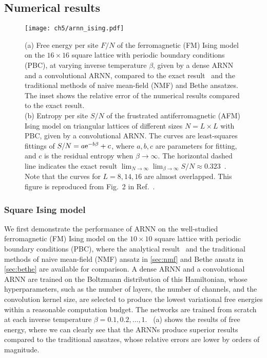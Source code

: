 \subsection{Numerical results}

\begin{figure}[htb]
\centering
\texttt{[image: ch5/arnn\_ising.pdf]}
\caption[ARNN results of Ising model on square and triangular lattices]{
(a) Free energy per site $F / N$ of the ferromagnetic (FM) Ising model on the $16 \times 16$ square lattice with periodic boundary conditions (PBC), at varying inverse temperature $\beta$, given by a dense ARNN and a convolutional ARNN, compared to the exact result~\cite{onsager1944crystal} and the traditional methods of naive mean-field (NMF) and Bethe ansatzes.
The inset shows the relative error of the numerical results compared to the exact result. \\
(b) Entropy per site $S / N$ of the frustrated antiferromagnetic (AFM) Ising model on triangular lattices of different sizes $N = L \times L$ with PBC, given by a convolutional ARNN.
The curves are least-squares fittings of $S / N = a \mathrm{e}^{-b \beta} + c$, where $a, b, c$ are parameters for fitting, and $c$ is the residual  entropy when $\beta \to \infty$.
The horizontal dashed line indicates the exact result $\lim_{N \to \infty} \lim_{\beta \to \infty} S / N \approx 0.323$~\cite{wannier1950antiferromagnetism, wannier1973antiferromagnetism, houtappel1950order}.
Note that the curves for $L = 8, 14, 16$ are almost overlapped.
This figure is reproduced from Fig.~2 in Ref.~\cite{wu2019solving}.
}
\label{fig:arnn-ising}
\end{figure}

\subsubsection{Square Ising model}

We first demonstrate the performance of ARNN on the well-studied ferromagnetic (FM) Ising model on the $10 \times 10$ square lattice with periodic boundary conditions (PBC), where the analytical result~\cite{onsager1944crystal} and the traditional methods of naive mean-field (NMF) ansatz in \cref{sec:nmf} and Bethe ansatz in \cref{sec:bethe} are available for comparison. A dense ARNN and a convolutional ARNN are trained on the Boltzmann distribution of this Hamiltonian, whose hyperparameters, such as the number of layers, the number of channels, and the convolution kernel size, are selected to produce the lowest variational free energies within a reasonable computation budget. The networks are trained from scratch at each inverse temperature $\beta = 0.1, 0.2, \ldots, 1$. ~(a) shows the results of free energy, where we can clearly see that the ARNNs produce superior results compared to the traditional ansatzes, whose relative errors are lower by orders of magnitude.


